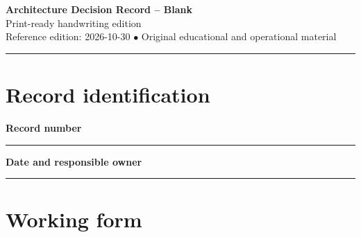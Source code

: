 \documentclass[10pt,letterpaper]{article}
\begin{document}
\begin{center}
{\LARGE\bfseries\color{cdblue}Architecture Decision Record -- Blank}\\[7pt]
{\large Print-ready handwriting edition}\\[6pt]
{\small Reference edition: 2026-10-30 $\bullet$ Original educational and operational material}
\end{center}
\noindent\color{cdblue}\rule{\linewidth}{1.2pt}\color{black}
\vspace{0.4em}
\section{Record identification}
\textbf{Record number}\par
\noindent\rule{\linewidth}{0.35pt}\par\vspace{0.7em}
\textbf{Date and responsible owner}\par
\noindent\rule{\linewidth}{0.35pt}\par\vspace{0.7em}

\section{Working form}
\end{document}
